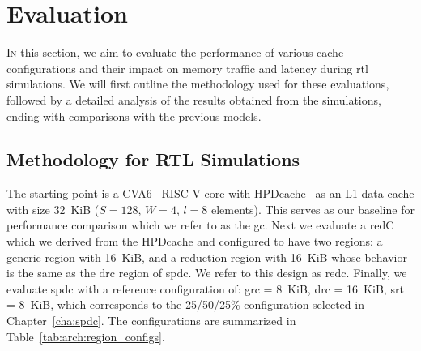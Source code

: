 
\section{Evaluation}
\label{sec:arch:eval}

\lettrine{I}{n} this section, we aim to evaluate the performance of various cache configurations and their impact on memory traffic and latency during \acrshort{rtl} simulations.
We will first outline the methodology used for these evaluations, followed by a detailed analysis of the results obtained from the simulations, ending with comparisons with the previous models.

\subsection{Methodology for RTL Simulations}

The starting point is a CVA6~\cite{Zaruba2019_CVA6} RISC-V core with HPDcache~\cite{Fuguet2023_HPDcache} as an L1 data-cache with size 32~KiB ($S=128$, $W=4$, $l=8$ elements).
This serves as our baseline for performance comparison which we refer to as the \acrfull{gc}.
Next we evaluate a \gls{redC} which we derived from the HPDcache and configured to have two regions: a generic region with 16~KiB, and a \gls{reduction} region with 16~KiB whose behavior is the same as the \acrshort{drc} region of \acrlong{spdc}.
We refer to this design as \acrshort{redc}.
Finally, we evaluate \acrfull{spdc} with a reference configuration of: \acrshort{grc} = 8~KiB, \acrshort{drc} = 16~KiB, \acrshort{srt} = 8~KiB, which corresponds to the 25/50/25\% configuration selected in Chapter~\ref{cha:spdc}.
The configurations are summarized in Table~\ref{tab:arch:region_configs}.

